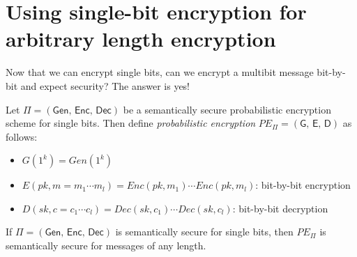 \documentclass[10pt]{article}
\begin{document}
\section{Using single-bit encryption for arbitrary length encryption}

Now that we can encrypt single bits, can we encrypt a multibit message bit-by-bit and expect security? The answer is yes!

Let $\Pi = (\textsf{Gen, Enc, Dec})$ be a semantically secure probabilistic encryption scheme for single bits. Then define \textit{probabilistic encryption} $PE_\Pi = (\textsf{G, E, D})$ as follows:

\begin{itemize}
  \item $G(1^k) = Gen(1^k)$
  \item $E(pk, m = m_1 \cdots m_l) = Enc(pk, m_1) \cdots Enc(pk, m_l)$: bit-by-bit encryption
  \item $D(sk, c = c_1 \cdots c_l) = Dec(sk, c_1) \cdots Dec(sk, c_l)$: bit-by-bit decryption
\end{itemize}

\begin{theorem}
  If $\Pi = (\textsf{Gen, Enc, Dec})$ is semantically secure for single bits, then $PE_\Pi$ is semantically secure for messages of any length.
\end{theorem}
\end{document}
